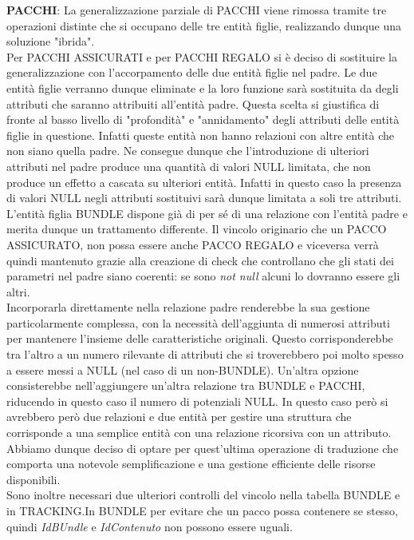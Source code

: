 \textbf{PACCHI}: La generalizzazione parziale di PACCHI viene rimossa tramite tre operazioni distinte che si occupano delle tre entità figlie, realizzando dunque una soluzione "ibrida".\\
Per PACCHI ASSICURATI e per PACCHI REGALO si è deciso di sostituire la generalizzazione con l'accorpamento delle due entità figlie nel padre. Le due entità figlie verranno dunque eliminate e 
la loro funzione sarà sostituita da degli attributi che saranno attribuiti all'entità padre. 
Questa scelta si giustifica di fronte al basso livello di "profondità" e "annidamento" degli attributi delle entità figlie in questione. Infatti queste entità non hanno relazioni con altre entità che non siano quella padre. 
Ne consegue dunque che l'introduzione di ulteriori attributi nel padre produce una quantità di valori NULL limitata, che non produce un effetto a cascata su ulteriori entità. Infatti in questo caso la presenza di valori NULL negli attributi sostituivi sarà dunque limitata a soli tre attributi.\\
L'entità figlia BUNDLE dispone già di per sé di una relazione con l'entità padre e merita dunque un trattamento differente. Il vincolo originario che un PACCO ASSICURATO, non possa essere anche PACCO REGALO e viceversa verrà quindi mantenuto grazie alla creazione di check che controllano che gli stati dei parametri nel padre siano coerenti: se sono \textit{not null} alcuni lo dovranno essere gli altri.\\
Incorporarla direttamente nella relazione padre renderebbe la sua gestione particolarmente complessa, con la necessità dell'aggiunta di numerosi attributi per mantenere l'insieme delle caratteristiche originali. Questo corrisponderebbe tra l'altro a un numero rilevante di attributi che si troverebbero poi molto spesso a essere messi a NULL (nel caso di un non-BUNDLE). 
Un'altra opzione consisterebbe  nell'aggiungere un'altra relazione tra BUNDLE e PACCHI, riducendo in questo caso il numero di potenziali NULL. In questo caso però si avrebbero però due relazioni e due entità per gestire una struttura che corrisponde a una semplice entità con una relazione ricorsiva con un attributo. Abbiamo dunque deciso di optare per quest'ultima operazione di traduzione che comporta una notevole semplificazione e una gestione efficiente delle risorse disponibili.\\
Sono inoltre necessari due ulteriori controlli del vincolo nella tabella BUNDLE e in TRACKING.In BUNDLE per evitare che un pacco possa contenere se stesso, quindi \textit{IdBUndle} e \textit{IdContenuto} non possono essere uguali.\\
